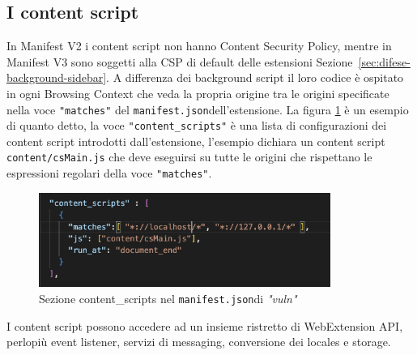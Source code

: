 \documentclass{sapthesis}
\newcommand{\code}[1]{\texttt{#1}}
\newcommand{\file}[1]{\code{#1}}
\newcommand{\refSection}[1]{Sezione~\ref{#1}}
\newcommand{\vuln}{\textit{"vuln"}}
\newcommand{\manifest}{\code{manifest.json}}
\begin{document}
            \subsection{I content script}
            \label{sec:difese-content-script}
                In Manifest V2 i content script non hanno Content Security Policy, mentre in Manifest V3 sono soggetti
                alla CSP di default delle estensioni \refSection{sec:difese-background-sidebar}.
                A differenza dei background script il loro codice è ospitato in ogni Browsing Context 
                che veda la propria origine tra le origini specificate nella voce \code{"matches"} del \manifest dell'estensione.
                La figura \ref{fig:vuln-manifest-contentscript} è un esempio di quanto detto,
                la voce \code{"content\_scripts"} è una lista di configurazioni dei content script introdotti dall'estensione,
                l'esempio dichiara un content script \file{content/csMain.js} che deve eseguirsi su tutte le
                origini che rispettano le espressioni regolari della voce \code{"matches"}.
    
                \begin{figure}[ht]
                    \centering
                    \includegraphics[width=0.85\textwidth]{vuln-manifest-content-script.png}
                    \caption{Sezione content\_scripts nel \manifest di \vuln}
                    \label{fig:vuln-manifest-contentscript}
                \end{figure}
    
                I content script possono accedere ad un insieme ristretto di WebExtension API, perlopiù event listener,
                servizi di messaging, conversione dei locales e storage.
    
\end{document}
